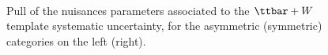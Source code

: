 \begin{figure}[tbhp]
    \caption{ Pull of the nuisances parameters associated to the $\ttbar+W$ template systematic uncertainty, 
      for the asymmetric (symmetric) categories on the left (right).
      \label{fig:nuisPull_TemplateZinv}}
  \begin{center}
     \\
  \end{center}
\end{figure}



